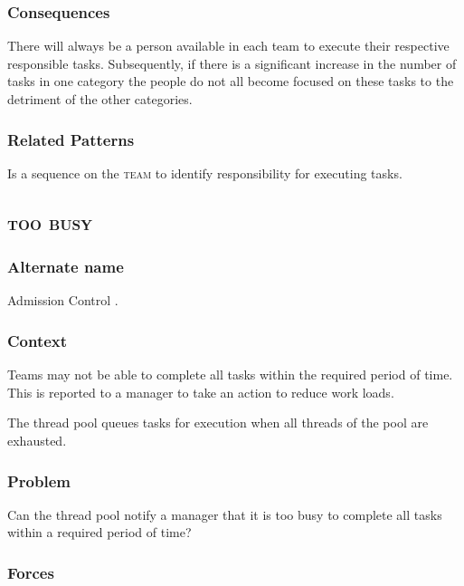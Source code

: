 \documentclass[prodmode]{style/acmlarge}
\begin{document}
\subsubsection*{Consequences}

There will always be a person available in each team to execute their respective
responsible tasks.  Subsequently, if there is a significant increase in the
number of tasks in one category the people do not all become focused on these
tasks to the detriment of the other categories.

\subsubsection*{Related Patterns}

Is a sequence on the \textsc{team} to identify responsibility for executing
tasks.


\subsection{\textsc{\textbf{too busy}}}

\subsubsection*{Alternate name}

Admission Control \cite{seda}. 

\subsubsection*{Context}

Teams may not be able to complete all tasks within the required period of time. 
This is reported to a manager to take an action to reduce work loads.

The thread pool queues tasks for execution when all threads of the pool are
exhausted. 

\subsubsection*{Problem}

Can the thread pool notify a manager that it is too busy to complete all tasks
within a required period of time?

\subsubsection*{Forces}
\end{document}

